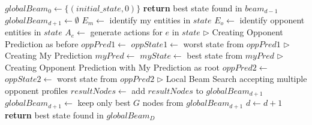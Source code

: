 \documentclass[shortabstract, mgr, english]{iithesis}
\newcommand{\LineComment}[1]{\enskip\(\triangleright\) #1}
\begin{document}
\begin{algorithm}
\caption{Nested Beam Search, Opponent Prediction with profiles}
\label{alg:BeamSearchProfiles}
\begin{algorithmic}[1]
    \State $globalBeam_0 \gets \{(initial\_state, 0)\}$ 
            \State \textbf{return} best state found in $beam_{d-1}$
        \EndIf
        \State $globalBeam_{d+1} \gets \emptyset$
            \State $E_m \gets$ identify my entities in $state$
            \State $E_o \gets$ identify opponent entities in $state$
                \State $A_e \gets$ generate actions for $e$ in $state$
            \EndFor
            \State \LineComment{Creating Opponent Prediction as before}
            \State $oppPred1 \gets$ 
            \State $oppState1 \gets$ worst state from $oppPred1$
            \State
            \State \LineComment{Creating My Prediction}
            \State $myPred \gets$ 
            \State $myState \gets$ best state from $myPred$
            \State
            \State \LineComment{Creating Opponent Prediction with My Prediction as root}
            \State $oppPred2 \gets$ 
            \State $oppState2 \gets$ worst state from $oppPred2$
            \State
            \State \LineComment{Local Beam Search accepting multiple opponent profiles}
            \State $resultNodes \gets$ 
            \State add $resultNodes$ to $globalBeam_{d+1}$
        \EndFor
        \State {}
            \State $globalBeam_{d+1} \gets$ keep only best $G$ nodes from $globalBeam_{d+1}$
        \EndIf
        \State $d \gets d + 1$
    \EndFor
    \State \textbf{return} best state found in $globalBeam_D$
\EndProcedure
{}
\end{algorithmic}
\end{algorithm}
\end{document}
